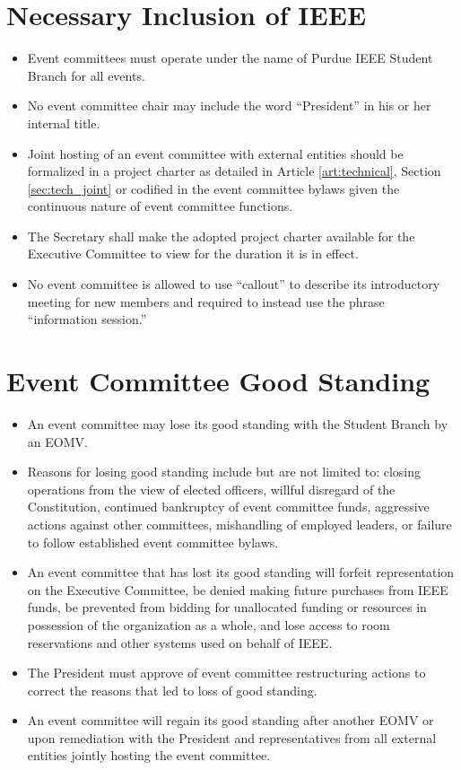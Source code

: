 \documentclass[12pt]{constitution}
\begin{document}
\section{Necessary Inclusion of IEEE}
\label{sec:inclusion}
\begin{itemize}
    \item Event committees must operate under the name of Purdue IEEE Student Branch for all events.
    \item No event committee chair may include the word ``President'' in his or her internal title.
    \item Joint hosting of an event committee with external entities should be formalized in a project charter as detailed in Article \ref{art:technical}, Section \ref{sec:tech_joint} or codified in the event committee bylaws given the continuous nature of event committee functions.
    \item The Secretary shall make the adopted project charter available for the Executive Committee to view for the duration it is in effect.
    \item No event committee is allowed to use ``callout'' to describe its introductory meeting for new members and required to instead use the phrase ``information session.''
\end{itemize}

\section{Event Committee Good Standing}
\label{sec:event_goodstand}
\begin{itemize}
    \item An event committee may lose its good standing with the Student Branch by an EOMV.
    \item Reasons for losing good standing include but are not limited to: closing operations from the view of elected officers, willful disregard of the Constitution, continued bankruptcy of event committee funds, aggressive actions against other committees, mishandling of employed leaders, or failure to follow established event committee bylaws.
    \item An event committee that has lost its good standing will forfeit representation on the Executive Committee, be denied making future purchases from IEEE funds, be prevented from bidding for unallocated funding or resources in possession of the organization as a whole, and lose access to room reservations and other systems used on behalf of IEEE.
    \item The President must approve of event committee restructuring actions to correct the reasons that led to loss of good standing.
    \item An event committee will regain its good standing after another EOMV or upon remediation with the President and representatives from all external entities jointly hosting the event committee.
\end{itemize}
\end{document}
